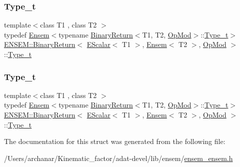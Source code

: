 \subsubsection{\texorpdfstring{Type\_t}{Type\_t}\hspace{0.1cm}{\footnotesize\ttfamily [2/3]}}
{\footnotesize\ttfamily template$<$class T1 , class T2 $>$ \\
typedef \mbox{\hyperlink{classENSEM_1_1Ensem}{Ensem}}$<$typename \mbox{\hyperlink{structENSEM_1_1BinaryReturn}{Binary\+Return}}$<$T1, T2, \mbox{\hyperlink{structENSEM_1_1OpMod}{Op\+Mod}}$>$\+::\mbox{\hyperlink{structENSEM_1_1BinaryReturn_3_01EScalar_3_01T1_01_4_00_01Ensem_3_01T2_01_4_00_01OpMod_01_4_ac4453d654bf941b42ef12c73739a4b54}{Type\+\_\+t}}$>$ \mbox{\hyperlink{structENSEM_1_1BinaryReturn}{E\+N\+S\+E\+M\+::\+Binary\+Return}}$<$ \mbox{\hyperlink{classENSEM_1_1EScalar}{E\+Scalar}}$<$ T1 $>$, \mbox{\hyperlink{classENSEM_1_1Ensem}{Ensem}}$<$ T2 $>$, \mbox{\hyperlink{structENSEM_1_1OpMod}{Op\+Mod}} $>$\+::\mbox{\hyperlink{structENSEM_1_1BinaryReturn_3_01EScalar_3_01T1_01_4_00_01Ensem_3_01T2_01_4_00_01OpMod_01_4_ac4453d654bf941b42ef12c73739a4b54}{Type\+\_\+t}}}

\mbox{\label{structENSEM_1_1BinaryReturn_3_01EScalar_3_01T1_01_4_00_01Ensem_3_01T2_01_4_00_01OpMod_01_4_ac4453d654bf941b42ef12c73739a4b54}} 
\subsubsection{\texorpdfstring{Type\_t}{Type\_t}\hspace{0.1cm}{\footnotesize\ttfamily [3/3]}}
{\footnotesize\ttfamily template$<$class T1 , class T2 $>$ \\
typedef \mbox{\hyperlink{classENSEM_1_1Ensem}{Ensem}}$<$typename \mbox{\hyperlink{structENSEM_1_1BinaryReturn}{Binary\+Return}}$<$T1, T2, \mbox{\hyperlink{structENSEM_1_1OpMod}{Op\+Mod}}$>$\+::\mbox{\hyperlink{structENSEM_1_1BinaryReturn_3_01EScalar_3_01T1_01_4_00_01Ensem_3_01T2_01_4_00_01OpMod_01_4_ac4453d654bf941b42ef12c73739a4b54}{Type\+\_\+t}}$>$ \mbox{\hyperlink{structENSEM_1_1BinaryReturn}{E\+N\+S\+E\+M\+::\+Binary\+Return}}$<$ \mbox{\hyperlink{classENSEM_1_1EScalar}{E\+Scalar}}$<$ T1 $>$, \mbox{\hyperlink{classENSEM_1_1Ensem}{Ensem}}$<$ T2 $>$, \mbox{\hyperlink{structENSEM_1_1OpMod}{Op\+Mod}} $>$\+::\mbox{\hyperlink{structENSEM_1_1BinaryReturn_3_01EScalar_3_01T1_01_4_00_01Ensem_3_01T2_01_4_00_01OpMod_01_4_ac4453d654bf941b42ef12c73739a4b54}{Type\+\_\+t}}}



The documentation for this struct was generated from the following file\+:\begin{DoxyCompactItemize}
\item 
/\+Users/archanar/\+Kinematic\+\_\+factor/adat-\/devel/lib/ensem/\mbox{\hyperlink{adat-devel_2lib_2ensem_2ensem__ensem_8h}{ensem\+\_\+ensem.\+h}}\end{DoxyCompactItemize}
